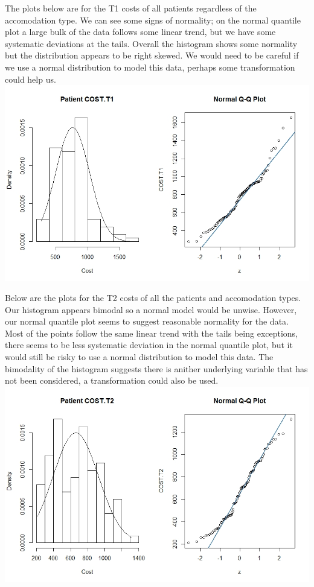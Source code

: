 \documentclass[]{article}
\begin{document}
The plots below are for the T1 costs of all patients regardless of the accomodation type. We can see some signs of normality; on the normal quantile plot a large bulk of the data follows some linear trend, but we have some systematic deviations at the tails. Overall the histogram shows some normality but the distribution appears to be right skewed. We would need to be careful if we use a normal distribution to model this data, perhaps some transformation could help us.
\centering
\includegraphics[width=\textwidth]{RStudio/jpeg/Norm_T1.jpeg}
\raggedright

Below are the plots for the T2 costs of all the patients and accomodation types. Our histogram appears bimodal so a normal model would be unwise. However, our normal quantile plot seems to suggest reasonable normality for the data. Most of the points follow the same linear trend with the tails being exceptions, there seems to be less systematic deviation in the normal quantile plot, but it would still be risky to use a normal distribution to model this data. The bimodality of the histogram suggests there is anither underlying variable that has not been considered, a transformation could also be used.
\centering
\includegraphics[width=\textwidth]{RStudio/jpeg/Norm_T2.jpeg}
\raggedright
\end{document}
